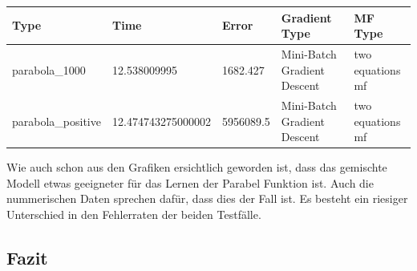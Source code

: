 \begin{center}\label{par_tab1_5000MB}
	\begin{tabular}{ | p{3.1cm} | l | l | p{3cm} | p{3cm} |}
		\hline
		Type & Time & Error & Gradient Type & MF Type \\ \hline
		parabola\_1000 & 12.538009995&1682.427&Mini-Batch Gradient Descent&two equations mf
		\\ \hline
		parabola\_positive & 12.474743275000002&5956089.5&Mini-Batch Gradient Descent&two equations mf
		\\ \hline
	\end{tabular}
\end{center}

Wie auch schon aus den Grafiken ersichtlich geworden ist, dass das gemischte Modell etwas geeigneter für das Lernen der Parabel Funktion ist. Auch die nummerischen Daten sprechen dafür, dass dies der Fall ist. Es besteht ein riesiger Unterschied in den Fehlerraten der beiden Testfälle.


\subsection{Fazit}


